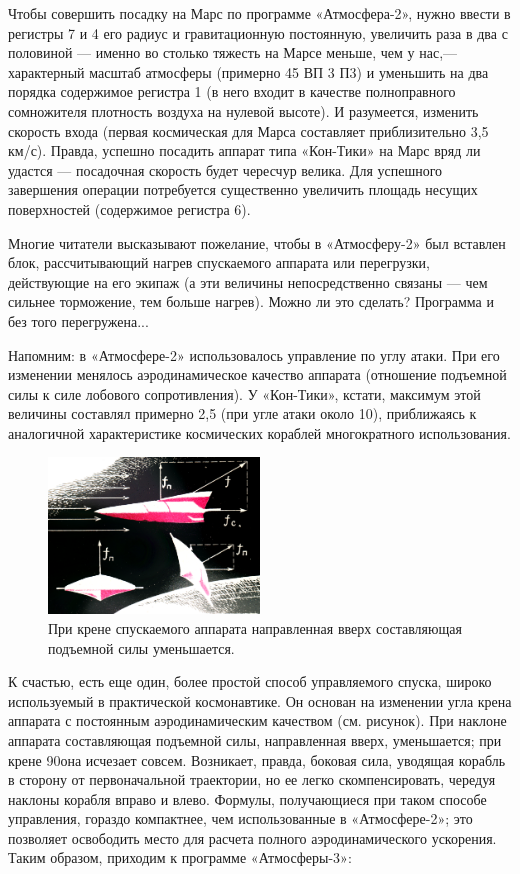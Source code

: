 \documentclass[11pt,a4paper,oneside]{article}
\begin{document}
Чтобы совершить посадку на Марс по программе «Атмосфера-2», нужно ввести в регистры 7 и 4 его радиус и гравитационную постоянную, увеличить раза в два с половиной — именно во столько тяжесть на Марсе меньше, чем у нас,— характерный масштаб атмосферы (примерно 45 ВП 3 П3) и уменьшить на два порядка содержимое регистра 1 (в него входит в качестве полноправного сомножителя плотность воздуха на нулевой высоте). И разумеется, изменить скорость входа (первая космическая для Марса составляет приблизительно 3,5 км/с). Правда, успешно посадить аппарат типа «Кон-Тики» на Марс вряд ли удастся — посадочная скорость будет чересчур велика. Для успешного завершения операции потребуется существенно увеличить площадь несущих поверхностей (содержимое регистра 6).

Многие читатели высказывают пожелание, чтобы в «Атмосферу-2» был вставлен блок, рассчитывающий нагрев спускаемого аппарата или перегрузки, действующие на его экипаж (а эти величины непосредственно связаны — чем сильнее торможение, тем больше нагрев). Можно ли это сделать? Программа и без того перегружена...

Напомним: в «Атмосфере-2» использовалось управление по углу атаки. При его изменении менялось аэродинамическое качество аппарата (отношение подъемной силы к силе лобового сопротивления). У «Кон-Тики», кстати, максимум этой величины составлял примерно 2,5 (при угле атаки около 10\degree), приближаясь к аналогичной характеристике космических кораблей многократного использования.

\begin{figure}[H]
\includegraphics[width=0.5\textwidth]{atmos3_1}
\caption{При крене спускаемого аппарата направленная вверх составляющая подъемной силы уменьшается.}
\end{figure}

К счастью, есть еще один, более простой способ управляемого спуска, широко используемый в практической космонавтике. Он основан на изменении угла крена аппарата с постоянным аэродинамическим качеством (см. рисунок). При наклоне аппарата составляющая подъемной силы, направленная вверх, уменьшается; при крене 90\degree она исчезает совсем. Возникает, правда, боковая сила, уводящая корабль в сторону от первоначальной траектории, но ее легко скомпенсировать, чередуя наклоны корабля вправо и влево. Формулы, получающиеся при таком способе управления, гораздо компактнее, чем использованные в «Атмосфере-2»; это позволяет освободить место для расчета полного аэродинамического ускорения. Таким образом, приходим к программе «Атмосферы-3»:
\end{document}
